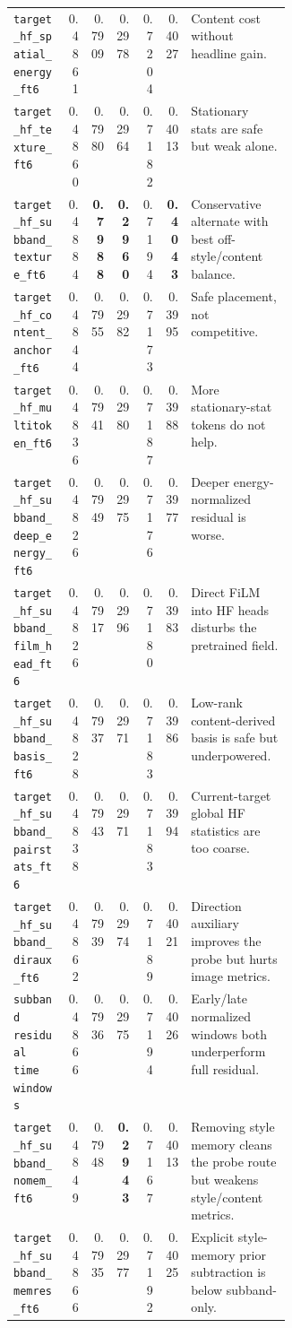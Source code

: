 \documentclass[10pt,twocolumn]{article}
\begin{document}
\begin{center}
{\begin{tabular}{lrrrrrp{0.36\linewidth}}
\texttt{target\_hf\_spatial\_energy\_ft6} & 0.4861 & 0.7909 & 0.2978 & 0.7204 & 0.4027 & Content cost without headline gain. \\
\texttt{target\_hf\_texture\_ft6} & 0.4860 & 0.7980 & 0.2964 & 0.7182 & 0.4013 & Stationary stats are safe but weak alone. \\
\texttt{target\_hf\_subband\_texture\_ft6} & 0.4884 & \textbf{0.7988} & \textbf{0.2960} & 0.7194 & \textbf{0.4043} & Conservative alternate with best off-style/content balance. \\
\texttt{target\_hf\_content\_anchor\_ft6} & 0.4844 & 0.7955 & 0.2982 & 0.7173 & 0.3995 & Safe placement, not competitive. \\
\texttt{target\_hf\_multitoken\_ft6} & 0.4836 & 0.7941 & 0.2980 & 0.7187 & 0.3988 & More stationary-stat tokens do not help. \\
\texttt{target\_hf\_subband\_deep\_energy\_ft6} & 0.4826 & 0.7949 & 0.2975 & 0.7176 & 0.3977 & Deeper energy-normalized residual is worse. \\
\texttt{target\_hf\_subband\_film\_head\_ft6} & 0.4826 & 0.7917 & 0.2996 & 0.7180 & 0.3983 & Direct FiLM into HF heads disturbs the pretrained field. \\
\texttt{target\_hf\_subband\_basis\_ft6} & 0.4828 & 0.7937 & 0.2971 & 0.7183 & 0.3986 & Low-rank content-derived basis is safe but underpowered. \\
\texttt{target\_hf\_subband\_pairstats\_ft6} & 0.4838 & 0.7943 & 0.2971 & 0.7183 & 0.3994 & Current-target global HF statistics are too coarse. \\
\texttt{target\_hf\_subband\_diraux\_ft6} & 0.4862 & 0.7939 & 0.2974 & 0.7189 & 0.4021 & Direction auxiliary improves the probe but hurts image metrics. \\
\texttt{subband residual time windows} & 0.4866 & 0.7936 & 0.2975 & 0.7194 & 0.4026 & Early/late normalized windows both underperform full residual. \\
\texttt{target\_hf\_subband\_nomem\_ft6} & 0.4849 & 0.7948 & \textbf{0.2943} & 0.7167 & 0.4013 & Removing style memory cleans the probe route but weakens style/content metrics. \\
\texttt{target\_hf\_subband\_memres\_ft6} & 0.4866 & 0.7935 & 0.2977 & 0.7192 & 0.4025 & Explicit style-memory prior subtraction is below subband-only. \\
\bottomrule
\end{tabular}}
\normalsize
\end{center}
\end{document}
